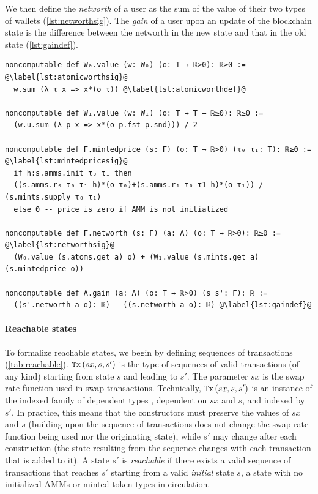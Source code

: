 We then define the \emph{networth} of a user as the sum of the value of their two types of wallets (\cref{lst:networthsig}). 
The \emph{gain} of a user upon an update of the blockchain state is the difference between the networth in the new state and that in the old state (\cref{lst:gaindef}).

\begin{table}[t]
\caption{Users' networth and gain.}
\label{list:networth}
\begin{lstlisting}
noncomputable def W₀.value (w: W₀) (o: T → ℝ>0): ℝ≥0 := @\label{lst:atomicworthsig}@
  w.sum (λ τ x => x*(o τ)) @\label{lst:atomicworthdef}@

noncomputable def W₁.value (w: W₁) (o: T → T → ℝ≥0): ℝ≥0 :=
  (w.u.sum (λ p x => x*(o p.fst p.snd))) / 2

noncomputable def Γ.mintedprice (s: Γ) (o: T → ℝ>0) (τ₀ τ₁: T): ℝ≥0 := @\label{lst:mintedpricesig}@
  if h:s.amms.init τ₀ τ₁ then
  ((s.amms.r₀ τ₀ τ₁ h)*(o τ₀)+(s.amms.r₁ τ₀ τ1 h)*(o τ₁)) / (s.mints.supply τ₀ τ₁)
  else 0 -- price is zero if AMM is not initialized

noncomputable def Γ.networth (s: Γ) (a: A) (o: T → ℝ>0): ℝ≥0 := @\label{lst:networthsig}@
  (W₀.value (s.atoms.get a) o) + (W₁.value (s.mints.get a) (s.mintedprice o))

noncomputable def A.gain (a: A) (o: T → ℝ>0) (s s': Γ): ℝ :=
  ((s'.networth a o): ℝ) - ((s.networth a o): ℝ) @\label{lst:gaindef}@
\end{lstlisting}
\end{table}


\paragraph*{Reachable states}

To formalize reachable states, we begin by defining sequences of transactions (\cref{tab:reachable}). 
$\code{Tx}\left(sx,s,s'\right)$ is the type of sequences of valid transactions
(of any kind)
starting from state $s$ and leading to $s'$.
The parameter $sx$ is the swap rate function used in swap transactions.
Technically, $\code{Tx}\left(sx,s,s'\right)$
is an instance of the indexed family of dependent types , dependent on $sx$ and $s$, and indexed by $s'$. In practice, this means that the constructors must preserve the values of $sx$ and $s$ (building upon the sequence of transactions does not change the swap rate function being used nor the originating state), while $s'$ may change after each construction (the state resulting from the sequence changes with each transaction that is added to it). 
A state $s'$ is \emph{reachable} if there exists a valid sequence of transactions that reaches $s'$ starting from a valid \emph{initial} state $s$, \ie a state with no initialized AMMs or minted token types in circulation.

